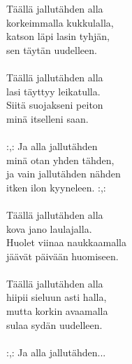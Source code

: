 
Täällä jallutähden alla \\ korkeimmalla kukkulalla, \\ katson läpi lasin tyhjän, \\ sen täytän uudelleen. \\ \hspace{10mm} \\ Täällä jallutähden alla \\ lasi täyttyy leikatulla. \\ Siitä suojakseni peiton \\ minä itselleni saan. \\ \hspace{10mm} \\ :,: Ja alla jallutähden \\ minä otan yhden tähden, \\ ja vain jallutähden nähden \\ itken ilon kyyneleen. :,:\\
 \hspace{10mm} \\ Täällä jallutähden alla \\ kova jano laulajalla. \\ Huolet viinaa naukkaamalla \\ jäävät päivään huomiseen. \\ \hspace{10mm} \\ Täällä jallutähden alla \\ hiipii sieluun asti halla, \\ mutta korkin avaamalla \\ sulaa sydän uudelleen. \\ \hspace{10mm} \\ :,: Ja alla jallutähden...